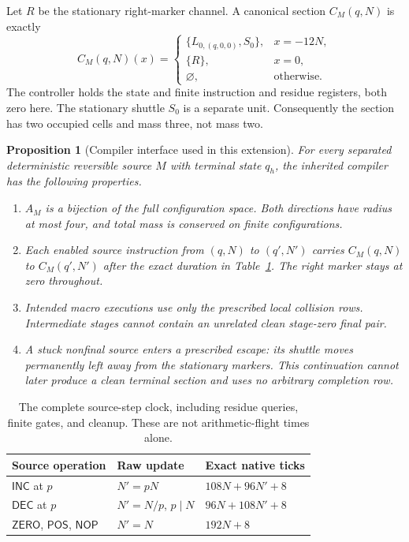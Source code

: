 \documentclass[11pt,letterpaper]{article}
\numberwithin{equation}{section}
\newtheorem{proposition}[theorem]{Proposition}
\theoremstyle{definition}
\theoremstyle{remark}
\newcommand{\INC}{\mathsf{INC}}\newcommand{\DEC}{\mathsf{DEC}}\newcommand{\NOP}{\mathsf{NOP}}\newcommand{\ZERO}{\mathsf{ZERO}}\newcommand{\POS}{\mathsf{POS}}
\begin{document}
Let $R$ be the stationary right-marker channel. A canonical section $C_M(q,N)$ is exactly
\begin{equation}\label{smc:ct:eq:canonical}
C_M(q,N)(x)=
\begin{cases}
\{L_{0,(q,0,0)},S_0\},&x=-12N,\\
\{R\},&x=0,\\
\varnothing,&\text{otherwise}.
\end{cases}
\end{equation}
The controller holds the state and finite instruction and residue registers, both zero here. The stationary shuttle $S_0$ is a separate unit. Consequently the section has two occupied cells and mass three, not mass two.

\begin{proposition}[Compiler interface used in this extension]\label{smc:ct:prop:interface}
For every separated deterministic reversible source $M$ with terminal state $q_h$, the inherited compiler has the following properties.
\begin{enumerate}
\item $A_M$ is a bijection of the full configuration space. Both directions have radius at most four, and total mass is conserved on finite configurations.
\item Each enabled source instruction from $(q,N)$ to $(q',N')$ carries $C_M(q,N)$ to $C_M(q',N')$ after the exact duration in Table~\ref{smc:ct:tab:clock}. The right marker stays at zero throughout.
\item Intended macro executions use only the prescribed local collision rows. Intermediate stages cannot contain an unrelated clean stage-zero final pair.
\item A stuck nonfinal source enters a prescribed escape: its shuttle moves permanently left away from the stationary markers. This continuation cannot later produce a clean terminal section and uses no arbitrary completion row.
\end{enumerate}
\end{proposition}

\begin{table}[htbp]
\centering
\begin{tabular}{@{}lll@{}}
\toprule
Source operation & Raw update & Exact native ticks\\
\midrule
$\INC$ at $p$ & $N'=pN$ & $108N+96N'+8$\\
$\DEC$ at $p$ & $N'=N/p$, $p\mid N$ & $96N+108N'+8$\\
$\ZERO$, $\POS$, $\NOP$ & $N'=N$ & $192N+8$\\
\bottomrule
\end{tabular}
\caption{The complete source-step clock, including residue queries, finite gates, and cleanup. These are not arithmetic-flight times alone.}\label{smc:ct:tab:clock}
\end{table}
\end{document}
